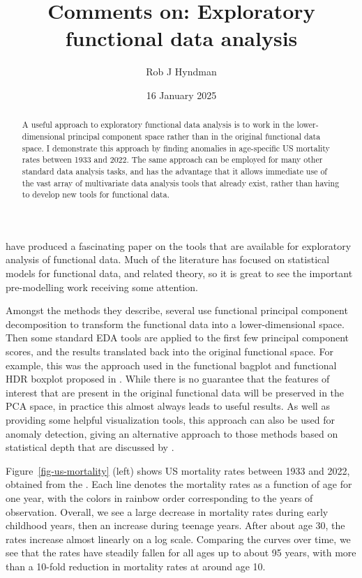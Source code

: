 \documentclass[
  11pt,
  a4paper,
]{article}
\title{Comments on: Exploratory functional data analysis}
\author{Rob J Hyndman}
\date{16 January 2025}
\let\oldmaketitle\maketitle
\def\maketitle{
\vspace*{-2cm}
\definecolor{shadecolor}{RGB}{210,210,210}
\begin{snugshade}\sffamily
\oldmaketitle
\end{snugshade}\vspace*{0.5cm}
\definecolor{shadecolor}{RGB}{248,248,248}
}
\begin{document}
\maketitle
\begin{abstract}
A useful approach to exploratory functional data analysis is to work in
the lower-dimensional principal component space rather than in the
original functional data space. I demonstrate this approach by finding
anomalies in age-specific US mortality rates between 1933 and 2022. The
same approach can be employed for many other standard data analysis
tasks, and has the advantage that it allows immediate use of the vast
array of multivariate data analysis tools that already exist, rather
than having to develop new tools for functional data.
\end{abstract}


\textcite{efda} have produced a fascinating paper on the tools that are
available for exploratory analysis of functional data. Much of the
literature has focused on statistical models for functional data, and
related theory, so it is great to see the important pre-modelling work
receiving some attention.

Amongst the methods they describe, several use functional principal
component decomposition \autocite{RD91} to transform the functional data
into a lower-dimensional space. Then some standard EDA tools are applied
to the first few principal component scores, and the results translated
back into the original functional space. For example, this was the
approach used in the functional bagplot and functional HDR boxplot
proposed in \textcite{HS10}. While there is no guarantee that the
features of interest that are present in the original functional data
will be preserved in the PCA space, in practice this almost always leads
to useful results. As well as providing some helpful visualization
tools, this approach can also be used for anomaly detection, giving an
alternative approach to those methods based on statistical depth that
are discussed by \textcite{efda}.

Figure~\ref{fig-us-mortality} (left) shows US mortality rates between
1933 and 2022, obtained from the \textcite{HMD}. Each line denotes the
mortality rates as a function of age for one year, with the colors in
rainbow order corresponding to the years of observation. Overall, we see
a large decrease in mortality rates during early childhood years, then
an increase during teenage years. After about age 30, the rates increase
almost linearly on a log scale. Comparing the curves over time, we see
that the rates have steadily fallen for all ages up to about 95 years,
with more than a 10-fold reduction in mortality rates at around age 10.
\end{document}
